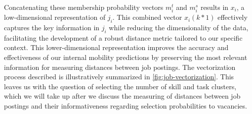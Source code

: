 Concatenating these membership probability vectors \(m_i^t\) and \(m_i^s\) results in \(x_i\), a low-dimensional 
representation of \(j_i\). This combined vector \(x_i (k * 1)\) effectively captures the key information in \(j_i\) 
while reducing the dimensionality of the data, facilitating the development of a robust distance metric tailored to 
our specific context. This lower-dimensional representation improves the accuracy and effectiveness of our internal 
mobility predictions by preserving the most relevant information for measuring distances between job postings. The 
vectorization process described is illustratively summarized in \autoref{fig:job-vectorization}. This leaves us with 
the question of selecting the number of skill and task clusters, which we will take up after we discuss the measuring 
of distances between job postings and their informativeness regarding selection probabilities to vacancies. 


